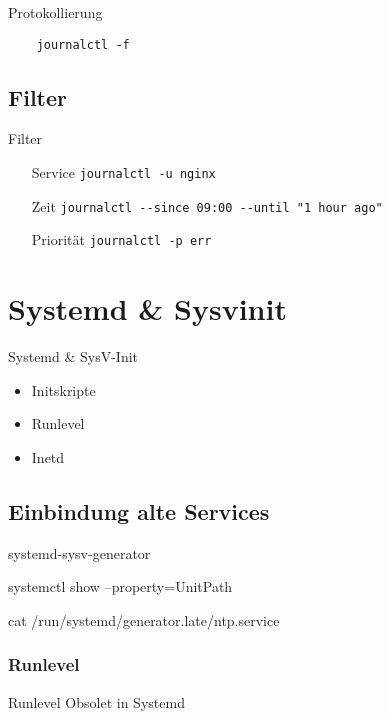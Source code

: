 \begin{frame}[fragile]{Protokollierung}
  \begin{lstlisting}
    journalctl -f
    \end{lstlisting}
\end{frame}
  
\subsection{Filter}

\begin{frame}[fragile]{Filter}
  \begin{itemize}
  \item[Service] \verb|journalctl -u nginx|
  \item[Zeit] \verb|journalctl --since 09:00 --until "1 hour ago"|
  \item[Priorität] \verb|journalctl -p err|
  \end{itemize}
\end{frame}

\section{Systemd \& Sysvinit}

\begin{frame}{Systemd \& SysV-Init}
  \begin{itemize}
  \item Initskripte
  \item Runlevel
  \item Inetd
  \end{itemize}
\end{frame}

\subsection{Einbindung alte Services}

\begin{frame}
systemd-sysv-generator

 systemctl show --property=UnitPath

 cat /run/systemd/generator.late/ntp.service
\end{frame}

 \subsubsection{Runlevel}

\begin{frame}{Runlevel}
 Obsolet in Systemd
\end{frame}

